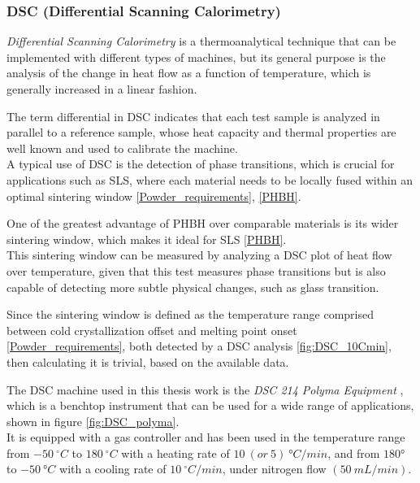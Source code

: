 \documentclass{article}
\begin{document}
            \subsubsection{DSC (Differential Scanning Calorimetry)\label{DSC_analysis}}
        
            \textit{Differential Scanning Calorimetry} is a thermoanalytical technique that can be implemented with different types of machines, 
            but its general purpose is the analysis of the change in heat flow as a function of temperature, which is generally increased in 
            a linear fashion. 
        
            
            The term differential in DSC indicates that each test sample is analyzed in parallel to a reference sample, whose heat capacity and 
            thermal properties are well known and used to calibrate the machine. \\
            
            A typical use of DSC is the detection of phase transitions, which is crucial for applications such as SLS, where each material 
            needs to be locally fused within an optimal sintering window \ref{Powder_requirements}, \ref{PHBH}. 
    
            One of the greatest advantage of PHBH over comparable materials is its wider sintering window, which makes it ideal 
            for SLS \ref{PHBH}. \\ 
    
            This sintering window can be measured by analyzing a DSC plot of heat flow over temperature, given that this test measures 
            phase transitions but is also capable of detecting more subtle physical changes, such as glass transition. 
    
            Since the sintering window is defined as the temperature range comprised between cold crystallization offset and 
            melting point onset \ref{Powder_requirements}, both detected by a DSC analysis \ref{fig:DSC_10Cmin}, then calculating it is trivial, 
            based on the available data.

                The DSC machine used in this thesis work is the \textit{DSC 214 Polyma Equipment} \autocites{Netzsch}, which is a benchtop instrument that can be used for 
                a wide range of applications, shown in figure \ref{fig:DSC_polyma}. \\ 

                It is equipped with a gas controller and has been used in the temperature range from $-50 \ ^{\circ} C$ 
                to $180 \ ^{\circ} C$ with 
                a heating rate of $10 \ (or \ 5) \ °C/min$, and from $180°$ to $-50 \ °C$ with a cooling rate of $10  \ ^{\circ}C/min$, 
                under nitrogen flow $(50 \ mL/min)$. \\ 
\end{document}
